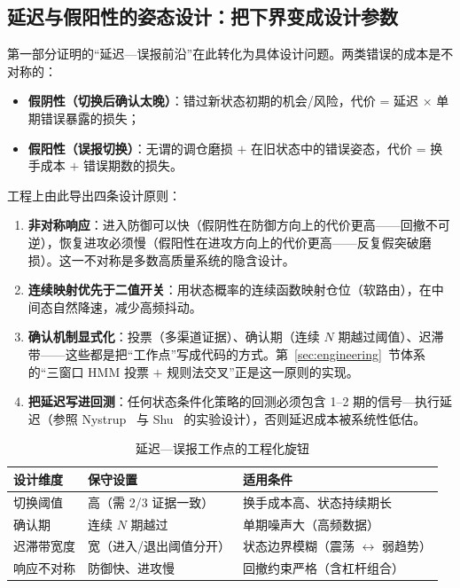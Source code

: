 \subsection{延迟与假阳性的姿态设计：把下界变成设计参数}

第一部分证明的“延迟—误报前沿”在此转化为具体设计问题。两类错误的成本是不对称的：

\begin{itemize}[itemsep=2pt]
\item \textbf{假阴性（切换后确认太晚）}：错过新状态初期的机会/风险，代价 = 延迟 $\times$ 单期错误暴露的损失；
\item \textbf{假阳性（误报切换）}：无谓的调仓磨损 $+$ 在旧状态中的错误姿态，代价 = 换手成本 $+$ 错误期数的损失。
\end{itemize}

工程上由此导出四条设计原则：

\begin{enumerate}[itemsep=3pt]
\item \textbf{非对称响应}：进入防御可以快（假阴性在防御方向上的代价更高——回撤不可逆），恢复进攻必须慢（假阳性在进攻方向上的代价更高——反复假突破磨损）。这一不对称是多数高质量系统的隐含设计。
\item \textbf{连续映射优先于二值开关}：用状态概率的连续函数映射仓位（软路由），在中间态自然降速，减少高频抖动。
\item \textbf{确认机制显式化}：投票（多渠道证据）、确认期（连续 $N$ 期越过阈值）、迟滞带——这些都是把“工作点”写成代码的方式。第~\ref{sec:engineering}~节体系的“三窗口 HMM 投票 $+$ 规则法交叉”正是这一原则的实现。
\item \textbf{把延迟写进回测}：任何状态条件化策略的回测必须包含 1--2 期的信号—执行延迟（参照 Nystrup~\cite{nystrup2018} 与 Shu~\cite{shu2024a} 的实验设计），否则延迟成本被系统性低估。
\end{enumerate}

\begin{table}[htbp]
\centering
\footnotesize
\begin{tabular}{p{3.0cm}p{4.2cm}p{4.8cm}}
\toprule
\textbf{设计维度} & \textbf{保守设置} & \textbf{适用条件} \\
\midrule
切换阈值 & 高（需 2/3 证据一致） & 换手成本高、状态持续期长 \\
确认期 & 连续 $N$ 期越过 & 单期噪声大（高频数据） \\
迟滞带宽度 & 宽（进入/退出阈值分开） & 状态边界模糊（震荡 $\leftrightarrow$ 弱趋势） \\
响应不对称 & 防御快、进攻慢 & 回撤约束严格（含杠杆组合） \\
\bottomrule
\end{tabular}
\caption{延迟—误报工作点的工程化旋钮}
\label{tab:workpoint}
\end{table}

